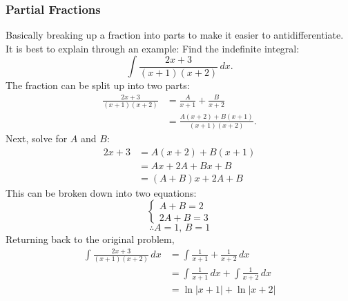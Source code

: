 \documentclass[12pt]{article}
\begin{document}
            \subsubsection{Partial Fractions}
                Basically breaking up a fraction into parts to make it easier to antidifferentiate. It is best to explain through an example:
                \newline \newline
                Find the indefinite integral:
                \[ \int \frac{2x+3}{(x+1)(x+2)} \, dx. \]
                The fraction can be split up into two parts:
                \begin{align*}
                    \frac{2x+3}{(x+1)(x+2)} &= \frac{A}{x+1} + \frac{B}{x+2} \\[6pt]
                    &= \frac{A(x+2) + B(x+1)}{(x+1)(x+2)}.
                \end{align*}
                Next, solve for $A$ and $B$:
                \begin{align*}
                    2x+3 &= A(x+2) + B(x+1) \\
                    &= Ax + 2A + Bx + B \\
                    &= (A+B)x + 2A + B
                \end{align*}
                This can be broken down into two equations:
                \[ \begin{cases}
                    A+B = 2 \\
                    2A + B = 3
                \end{cases} \]
                \[ \therefore A = 1, \, B = 1 \]
                Returning back to the original problem,
                \begin{align*}
                    \int \frac{2x+3}{(x+1)(x+2)} \, dx &= \int \frac{1}{x+1} + \frac{1}{x+2} \, dx \\[6pt]
                    &= \int \frac{1}{x+1} \, dx + \int \frac{1}{x+2} \, dx \\
                    &= \ln|x+1| + \ln|x+2|
                \end{align*}
\end{document}
